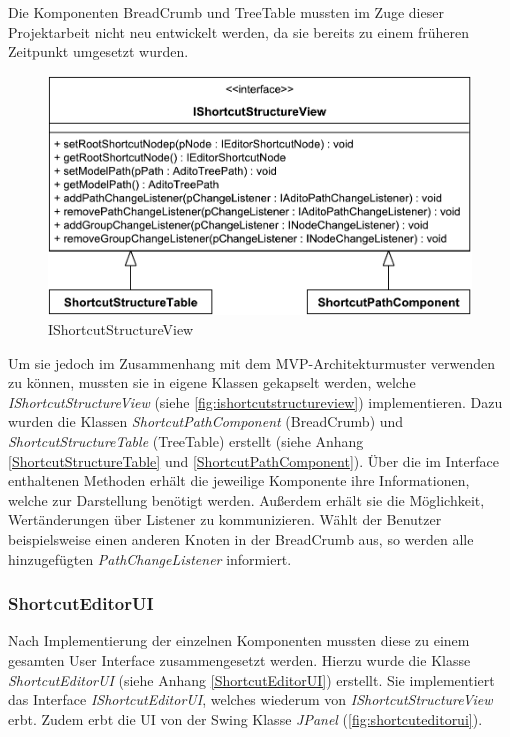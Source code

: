 Die Komponenten BreadCrumb und TreeTable mussten im Zuge dieser Projektarbeit nicht neu entwickelt werden, da sie bereits zu einem früheren Zeitpunkt umgesetzt wurden. 

\begin{figure}
	\vspace{-12px}
	\centering
	\includegraphics[width=1\linewidth]{../graphic/diagrams/CD_IShortcutStructureView/IShortcutStructureView}
	\caption{IShortcutStructureView}
	\label{fig:ishortcutstructureview}
\end{figure}

Um sie jedoch im Zusammenhang mit dem MVP-Architekturmuster verwenden zu können, mussten sie in eigene Klassen gekapselt werden, welche \emph{IShortcutStructureView} (siehe \autoref{fig:ishortcutstructureview}) implementieren. Dazu wurden die Klassen \emph{ShortcutPathComponent} (BreadCrumb) und \emph{ShortcutStructureTable} (TreeTable) erstellt (siehe Anhang \ref{ShortcutStructureTable} und \ref{ShortcutPathComponent}). Über die im Interface enthaltenen Methoden erhält die jeweilige Komponente ihre Informationen, welche zur Darstellung benötigt werden. Außerdem erhält sie die Möglichkeit, Wertänderungen über Listener zu kommunizieren. Wählt der Benutzer beispielsweise einen anderen Knoten in der BreadCrumb aus, so werden alle hinzugefügten \emph{PathChangeListener} informiert.


\subsubsection{ShortcutEditorUI}

Nach Implementierung der einzelnen Komponenten mussten diese zu einem gesamten User Interface zusammengesetzt werden. Hierzu wurde die Klasse \emph{ShortcutEditorUI} (siehe Anhang \ref{ShortcutEditorUI}) erstellt. Sie implementiert das Interface \emph{IShortcutEditorUI}, welches wiederum von \emph{IShortcutStructureView} erbt. Zudem erbt die UI von der Swing Klasse \emph{JPanel} (\autoref{fig:shortcuteditorui}).

